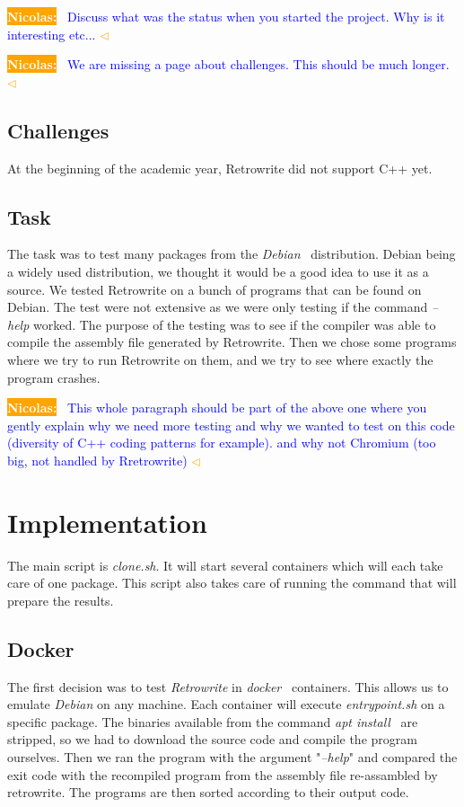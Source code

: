 \documentclass[a4paper,11pt,oneside]{report}
\newcommand{\sysname}{Retrowrite\xspace}
\newcommand{\todobox}[3]{%
    \colorbox{#1}{\textcolor{white}{\sffamily\bfseries\scriptsize #2}}%
    ~\textcolor{blue}{#3} %
    \textcolor{#1}{$\triangleleft$}%
}
\newcommand{\nb}[1]{\todobox{orange}{Nicolas:}{#1}}
\begin{document}
\nb{Discuss what was the status when you started the
project. Why is it interesting etc...}


\nb{We are missing a page about challenges. This should be much longer.}

\section{Challenges}
At the beginning of the academic year, \sysname did not support C++ yet. 

\section{Task}
The task was to test many packages from the
\textit{Debian}~\cite{debian} distribution. Debian being a widely used
distribution, we thought it would be a good idea to use it as a source. 
We tested Retrowrite on a bunch of programs that can be found on Debian.
The test were not extensive as we were only testing if the command
\textit{--help} worked. The purpose of the testing was to see if the compiler
was able to compile the assembly file generated by \sysname.
Then we chose some programs where we try to run \sysname on them, and we try to
see where exactly the program crashes.

\nb{This whole paragraph
    should be part of the above one where you gently explain why we need more
    testing and why we wanted to test on this code (diversity of C++ coding patterns
for example). and why not Chromium (too big, not handled by Rretrowrite)}


\chapter{Implementation}

The main script is \textit{clone.sh}. It will start several containers which will
each take care of one package. This script also takes care of running the
command that will prepare the results.

\section{Docker}
The first decision was to test \textit{Retrowrite} in
\textit{docker}~\cite{merkel2014docker} containers. This allows us to emulate
\textit{Debian} on any machine. Each container will execute
\textit{entrypoint.sh} on a specific package. The binaries available from the
command \textit{apt install}~\cite{apt} are stripped, so we had to download the
source code and compile the program ourselves. Then we ran the program with the
argument "\textit{--help}" and compared the exit code with the recompiled
program from the assembly file re-assambled by retrowrite. The programs are
then sorted according to their output code.
\end{document}
